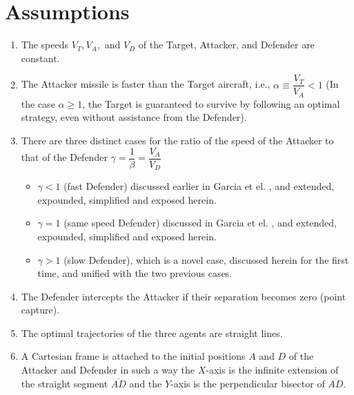 \section{Assumptions}
\begin{enumerate}
\item The speeds $V_{T},V_{A},$ and $V_{D}$ of the Target, Attacker, and Defender are constant.
\item The Attacker missile is faster than the Target aircraft, i.e., $\alpha\equiv \dfrac{V_{T}}{V_{A}}<1$ (In the case $\alpha\geq1$, the Target is guaranteed to survive by following an optimal strategy, even without assistance from the Defender).
\item There are three distinct cases for the ratio of the speed of the Attacker to that of the Defender $\gamma=\dfrac{1}{\beta}=\dfrac{V_{A}}{V_{D}}$ 
\begin{itemize}
\item $\gamma<1$ (fast Defender) discussed earlier in Garcia et el. \cite{garcia2015active}, and extended, expounded, simplified and exposed herein.
\item $\gamma =1$ (same speed Defender) discussed in Garcia et el. \cite{pachter2014active,garcia2015escape}, and extended, expounded, simplified and exposed herein.
\item $\gamma>1$ (slow Defender), which is a novel case, discussed herein for the first time, and unified with the two previous cases.  
\end{itemize}

\item The Defender intercepts the Attacker if their separation becomes zero (point capture).
\item The optimal trajectories of the three agents are straight lines.
\item A Cartesian frame is attached to the initial positions $A$ and $D$ of the Attacker and Defender in such a way the $X$-axis is the infinite extension of the straight segment $\overline{AD}$ and the $Y$-axis is the perpendicular bisector of $\overline{AD}$.
\end{enumerate}

